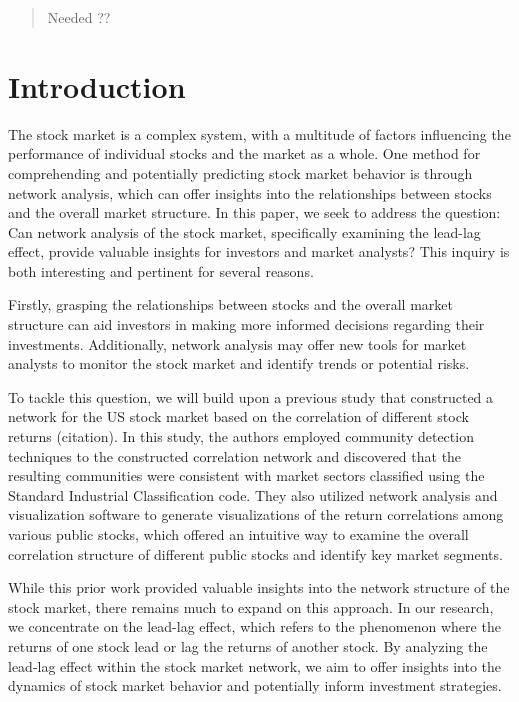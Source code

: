 \documentclass[onefignum,onetabnum]{siamart171218}
\begin{document}
\maketitle

\begin{abstract}
  Needed ??
\end{abstract}




\section{Introduction}

The stock market is a complex system, with a multitude of factors influencing the performance of individual stocks and the market as a whole. One method for comprehending and potentially predicting stock market behavior is through network analysis, which can offer insights into the relationships between stocks and the overall market structure. In this paper, we seek to address the question: Can network analysis of the stock market, specifically examining the lead-lag effect, provide valuable insights for investors and market analysts? This inquiry is both interesting and pertinent for several reasons.

Firstly, grasping the relationships between stocks and the overall market structure can aid investors in making more informed decisions regarding their investments. Additionally, network analysis may offer new tools for market analysts to monitor the stock market and identify trends or potential risks.

To tackle this question, we will build upon a previous study that constructed a network for the US stock market based on the correlation of different stock returns (citation). In this study, the authors employed community detection techniques to the constructed correlation network and discovered that the resulting communities were consistent with market sectors classified using the Standard Industrial Classification  code. They also utilized network analysis and visualization software to generate visualizations of the return correlations among various public stocks, which offered an intuitive way to examine the overall correlation structure of different public stocks and identify key market segments.

While this prior work provided valuable insights into the network structure of the stock market, there remains much to expand on this approach. In our research, we  concentrate on the lead-lag effect, which refers to the phenomenon where the returns of one stock lead or lag the returns of another stock. By analyzing the lead-lag effect within the stock market network, we aim to offer insights into the dynamics of stock market behavior and potentially inform investment strategies.
\end{document}
